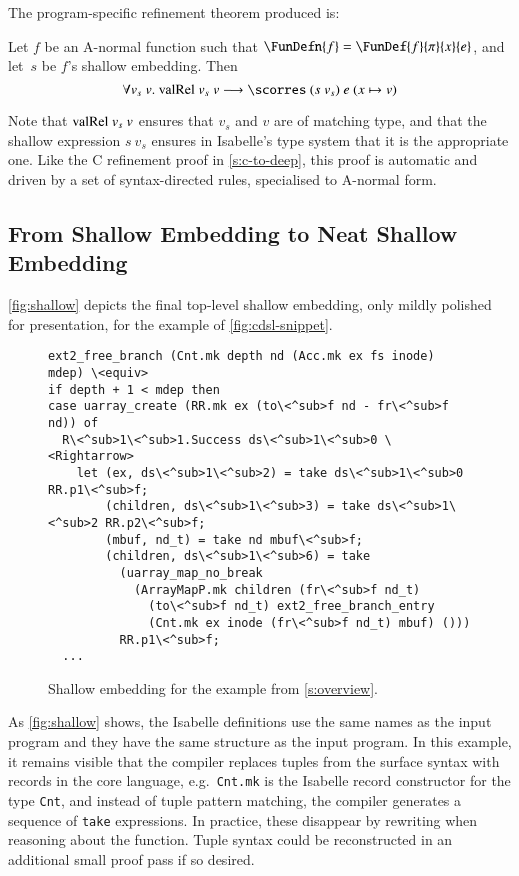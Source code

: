 \documentclass[9pt\ifFinal\else,preprint,nocopyrightspace\fi,\ifAlpha\else natbib,authoryear\fi]{sigplanconf}
\newcommand{\code}[1]{\texttt{#1}}
\begin{document}
The program-specific refinement theorem produced is:
\begin{theorem}
Let $f$ be an A-normal \CDSL function such that
$\FunDefn{f} = \FunDef{f}{\pi}{x}{e}$, and
let~$s$ be $f$'s shallow embedding. Then
$$\forall v_s\ v.\ \valRel\ v_s\ v \longrightarrow \scorres\ (s\ v_s)\ e\ (x \mapsto v)$$
\end{theorem}

\noindent
Note that $\mathrm{valRel}\ v_s\ v$ ensures that $v_s$ and $v$ are of matching type,
and that the shallow expression $s\ v_s$ ensures in Isabelle's type system
that it is the appropriate one. Like the C refinement proof in
\autoref{s:c-to-deep}, this proof is automatic and driven by a set of
syntax-directed \scorres rules, specialised to \CDSL A-normal form.


\subsection{From Shallow Embedding to Neat Shallow Embedding}

\autoref{fig:shallow} depicts the final top-level shallow embedding, only mildly polished for
presentation, for the \cdsl example of \autoref{fig:cdsl-snippet}.

\begin{figure}[ht]
\begin{lstlisting}[style=isa]
ext2_free_branch (Cnt.mk depth nd (Acc.mk ex fs inode) mdep) \<equiv>
if depth + 1 < mdep then 
case uarray_create (RR.mk ex (to\<^sub>f nd - fr\<^sub>f nd)) of
  R\<^sub>1\<^sub>1.Success ds\<^sub>1\<^sub>0 \<Rightarrow>
    let (ex, ds\<^sub>1\<^sub>2) = take ds\<^sub>1\<^sub>0 RR.p1\<^sub>f;
        (children, ds\<^sub>1\<^sub>3) = take ds\<^sub>1\<^sub>2 RR.p2\<^sub>f;
        (mbuf, nd_t) = take nd mbuf\<^sub>f;
        (children, ds\<^sub>1\<^sub>6) = take
          (uarray_map_no_break
            (ArrayMapP.mk children (fr\<^sub>f nd_t)
              (to\<^sub>f nd_t) ext2_free_branch_entry
              (Cnt.mk ex inode (fr\<^sub>f nd_t) mbuf) ()))
          RR.p1\<^sub>f;
  ...    
\end{lstlisting}
\caption{Shallow embedding for the example from \autoref{s:overview}.}
\label{fig:shallow}
\end{figure}

\noindent As \autoref{fig:shallow} shows, the Isabelle definitions use the same names
as the \cdsl input program and they have the same structure as the input
program. In this example, it remains visible that the compiler replaces
tuples from the surface syntax with records in the core language, e.g.\
\code{Cnt.mk} is the Isabelle record constructor for the type \code{Cnt}, and
instead of tuple pattern matching, the compiler generates a sequence of
\code{take} expressions. In practice, these disappear by rewriting when 
reasoning about the function. Tuple syntax could be reconstructed
in an additional small proof pass if so desired.
\end{document}
